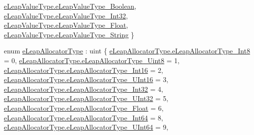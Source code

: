 \begin{DoxyCompactItemize}
\mbox{\hyperlink{namespace_leap_internal_a9c15e305893cd05c1ec6d65cea48737cae125cb2d1a42d11a353b868b36684eb4}{e\+Leap\+Value\+Type.\+e\+Leap\+Value\+Type\+\_\+\+Boolean}}, 
\mbox{\hyperlink{namespace_leap_internal_a9c15e305893cd05c1ec6d65cea48737caa35e88d45f8c4e354481d7e342386569}{e\+Leap\+Value\+Type.\+e\+Leap\+Value\+Type\+\_\+\+Int32}}, 
\mbox{\hyperlink{namespace_leap_internal_a9c15e305893cd05c1ec6d65cea48737cafa1be53efc0f7d2ca1bfe5e2d9b1e50b}{e\+Leap\+Value\+Type.\+e\+Leap\+Value\+Type\+\_\+\+Float}}, 
\newline
\mbox{\hyperlink{namespace_leap_internal_a9c15e305893cd05c1ec6d65cea48737cae1eb4d31ca9ca73934c9b70a9d6eb5ca}{e\+Leap\+Value\+Type.\+e\+Leap\+Value\+Type\+\_\+\+String}}
 \}
\item 
enum \mbox{\hyperlink{namespace_leap_internal_a0c50b13c3367bbb0a225d62335fb6aab}{e\+Leap\+Allocator\+Type}} \+: uint \{ \newline
\mbox{\hyperlink{namespace_leap_internal_a0c50b13c3367bbb0a225d62335fb6aabafbb93b813209accdaa3426450d418faf}{e\+Leap\+Allocator\+Type.\+e\+Leap\+Allocator\+Type\+\_\+\+Int8}} = 0, 
\mbox{\hyperlink{namespace_leap_internal_a0c50b13c3367bbb0a225d62335fb6aaba9905c72387244b8ec78f41af23d9d81a}{e\+Leap\+Allocator\+Type.\+e\+Leap\+Allocator\+Type\+\_\+\+Uint8}} = 1, 
\mbox{\hyperlink{namespace_leap_internal_a0c50b13c3367bbb0a225d62335fb6aaba796e26fae6c2eec1653f24161a0a2364}{e\+Leap\+Allocator\+Type.\+e\+Leap\+Allocator\+Type\+\_\+\+Int16}} = 2, 
\mbox{\hyperlink{namespace_leap_internal_a0c50b13c3367bbb0a225d62335fb6aaba9124edaef176dd8f215cd10f5db44b89}{e\+Leap\+Allocator\+Type.\+e\+Leap\+Allocator\+Type\+\_\+\+U\+Int16}} = 3, 
\newline
\mbox{\hyperlink{namespace_leap_internal_a0c50b13c3367bbb0a225d62335fb6aabad6878c6ecf9f0bd62e7cdee56fcf11ab}{e\+Leap\+Allocator\+Type.\+e\+Leap\+Allocator\+Type\+\_\+\+Int32}} = 4, 
\mbox{\hyperlink{namespace_leap_internal_a0c50b13c3367bbb0a225d62335fb6aabac536844b230dac61b932ef427c069686}{e\+Leap\+Allocator\+Type.\+e\+Leap\+Allocator\+Type\+\_\+\+U\+Int32}} = 5, 
\mbox{\hyperlink{namespace_leap_internal_a0c50b13c3367bbb0a225d62335fb6aaba8a6061a01032ac288aee1a24ebcd1b59}{e\+Leap\+Allocator\+Type.\+e\+Leap\+Allocator\+Type\+\_\+\+Float}} = 6, 
\mbox{\hyperlink{namespace_leap_internal_a0c50b13c3367bbb0a225d62335fb6aaba77bd10e6e39bfc896597bb564237a345}{e\+Leap\+Allocator\+Type.\+e\+Leap\+Allocator\+Type\+\_\+\+Int64}} = 8, 
\newline
\mbox{\hyperlink{namespace_leap_internal_a0c50b13c3367bbb0a225d62335fb6aaba121296f7684ee905fc2abcc9ba8e9d0e}{e\+Leap\+Allocator\+Type.\+e\+Leap\+Allocator\+Type\+\_\+\+U\+Int64}} = 9, 

\end{DoxyCompactItemize}

